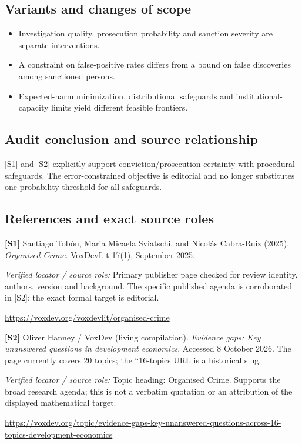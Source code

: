 \documentclass[11pt,a4paper]{article}
\begin{document}
\subsection*{Variants and changes of scope}

\begin{itemize}
\item Investigation quality, prosecution probability and sanction severity are separate interventions.
\item A constraint on false-positive rates differs from a bound on false discoveries among sanctioned persons.
\item Expected-harm minimization, distributional safeguards and institutional-capacity limits yield different feasible frontiers.
\end{itemize}

\subsection*{Audit conclusion and source relationship}

[S1] and [S2] explicitly support conviction/prosecution certainty with procedural safeguards. The error-constrained objective is editorial and no longer substitutes one probability threshold for all safeguards.

\subsection*{References and exact source roles}

{\footnotesize\raggedright
\par\noindent\textbf{[S1]} Santiago Tobón, Maria Micaela Sviatschi, and Nicolás Cabra-Ruiz (2025). \emph{Organised Crime}. VoxDevLit 17(1), September 2025.\par \textit{Verified locator / source role:} Primary publisher page checked for review identity, authors, version and background. The specific published agenda is corroborated in [S2]; the exact formal target is editorial.\par \url{https://voxdev.org/voxdevlit/organised-crime}\par\smallskip
\par\noindent\textbf{[S2]} Oliver Hanney / VoxDev (living compilation). \emph{Evidence gaps: Key unanswered questions in development economics}. Accessed 8 October 2026. The page currently covers 20 topics; the ``16-topics URL is a historical slug.\par \textit{Verified locator / source role:} Topic heading: Organised Crime. Supports the broad research agenda; this is not a verbatim quotation or an attribution of the displayed mathematical target.\par \url{https://voxdev.org/topic/evidence-gaps-key-unanswered-questions-across-16-topics-development-economics}\par\smallskip
}
\end{document}
